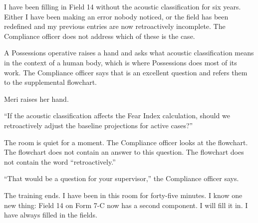 I have been filling in Field 14 without the acoustic classification for six years. Either I have been making an error nobody noticed, or the field has been redefined and my previous entries are now retroactively incomplete. The Compliance officer does not address which of these is the case.

A Possessions operative raises a hand and asks what acoustic classification means in the context of a human body, which is where Possessions does most of its work. The Compliance officer says that is an excellent question and refers them to the supplemental flowchart.

Meri raises her hand.

``If the acoustic classification affects the Fear Index calculation, should we retroactively adjust the baseline projections for active cases?''

The room is quiet for a moment. The Compliance officer looks at the flowchart. The flowchart does not contain an answer to this question. The flowchart does not contain the word ``retroactively.''

``That would be a question for your supervisor,'' the Compliance officer says.

The training ends. I have been in this room for forty-five minutes. I know one new thing: Field 14 on Form 7-C now has a second component. I will fill it in. I have always filled in the fields.
